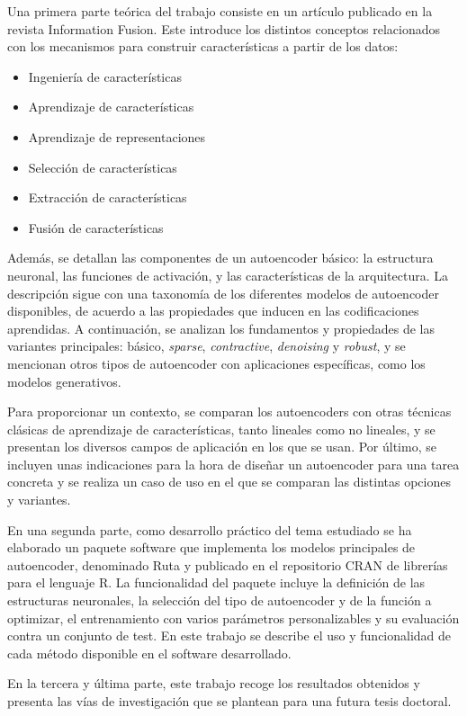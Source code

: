 \documentclass[oneside,openright,titlepage,numbers=noenddot,openany,headinclude,footinclude=true,
cleardoublepage=empty,abstractoff,BCOR=5mm,paper=a4,fontsize=12pt,main=spanish]{scrreprt}
\begin{document}
Una primera parte teórica del trabajo consiste en un artículo publicado en la revista Information Fusion. Este introduce los distintos conceptos relacionados con los mecanismos para construir características a partir de los datos:
\begin{itemize}
\item Ingeniería de características
\item Aprendizaje de características
\item Aprendizaje de representaciones
\item Selección de características
\item Extracción de características
\item Fusión de características
\end{itemize}
Además, se detallan las componentes de un autoencoder básico: la estructura neuronal, las funciones de activación, y las características de la arquitectura. La descripción sigue con una taxonomía de los diferentes modelos de autoencoder disponibles, de acuerdo a las propiedades que inducen en las codificaciones aprendidas. A continuación, se analizan los fundamentos y propiedades de las variantes principales: básico, \textit{sparse}, \textit{contractive}, \textit{denoising} y \textit{robust}, y se mencionan otros tipos de autoencoder con aplicaciones específicas, como los modelos generativos.

Para proporcionar un contexto, se comparan los autoencoders con otras técnicas clásicas de aprendizaje de características, tanto lineales como no lineales, y se presentan los diversos campos de aplicación en los que se usan. Por último, se incluyen unas indicaciones para la hora de diseñar un autoencoder para una tarea concreta y se realiza un caso de uso en el que se comparan las distintas opciones y variantes.

En una segunda parte, como desarrollo práctico del tema estudiado se ha elaborado un paquete software que implementa los modelos principales de autoencoder, denominado Ruta y publicado en el repositorio CRAN de librerías para el lenguaje R. La funcionalidad del paquete incluye la definición de las estructuras neuronales, la selección del tipo de autoencoder y de la función a optimizar, el entrenamiento con varios parámetros personalizables y su evaluación contra un conjunto de test. En este trabajo se describe el uso y funcionalidad de cada método disponible en el software desarrollado.

En la tercera y última parte, este trabajo recoge los resultados obtenidos y presenta las vías de investigación que se plantean para una futura tesis doctoral.
\end{document}
